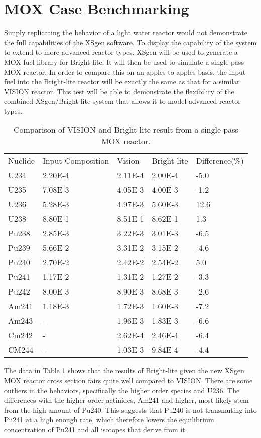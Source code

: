 \documentclass{article}
\begin{document}
\section{MOX Case Benchmarking}
Simply replicating the behavior of a light water reactor would not demonstrate the full capabilities of the XSgen software. To display the capability of the system to extend to more advanced reactor types, XSgen will be used to generate a MOX fuel library for Bright-lite. It will then be used to simulate a single pass MOX reactor. In order to compare this on an apples to apples basis, the input fuel into the Bright-lite reactor will be exactly the same as that for a similar VISION reactor. This test will be able to demonstrate the flexibility of the combined XSgen/Bright-lite system that allows it to model advanced reactor types.

\begin{table}[!htb]
\centering
\caption{Comparison of VISION and Bright-lite result from a single pass MOX reactor.}
\label{tab:g}
\begin{tabular}{lllll}
Nuclide & Input Composition & Vision & Bright-lite & Difference(\%) \\
U234 & 2.20E-4 & 2.11E-4 & 2.00E-4 & -5.0\\
U235 & 7.08E-3 & 4.05E-3 & 4.00E-3 & -1.2\\
U236 & 5.28E-3 & 4.97E-3 & 5.60E-3 & 12.6\\
U238 & 8.80E-1 & 8.51E-1 & 8.62E-1 & 1.3\\
Pu238 & 2.85E-3 & 3.22E-3 & 3.01E-3 & -6.5\\
Pu239 & 5.66E-2 & 3.31E-2 & 3.15E-2 & -4.6\\
Pu240 & 2.70E-2 & 2.42E-2 & 2.54E-2 & 5.0\\
Pu241 & 1.17E-2 & 1.31E-2 & 1.27E-2 & -3.3\\
Pu242 & 8.00E-3 & 8.90E-3 & 8.68E-3 & -2.6\\
Am241 & 1.18E-3 & 1.72E-3 & 1.60E-3 & -7.2\\
Am243 & - & 1.96E-3 & 1.83E-3 & -6.6\\
Cm242 & - & 2.62E-4 & 2.46E-4 & -6.4\\
CM244 & - & 1.03E-3 & 9.84E-4 & -4.4
\end{tabular}
\end{table}

The data in Table \ref{tab:g} shows that the results of Bright-lite given the new XSgen MOX reactor cross section fairs quite well compared to VISION. There are some outliers in the behaviors, specifically the higher order species and U236. The differences with the higher order actinides, Am241 and higher, most likely stem from the high amount of Pu240. This suggests that Pu240 is not transmuting into Pu241 at a high enough rate, which therefore lowers the equilibrium concentration of Pu241 and all isotopes that derive from it.
\end{document}
